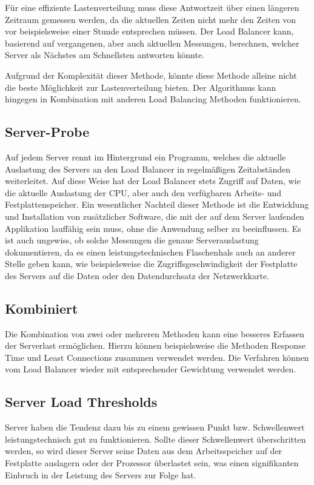 Für eine effiziente Lastenverteilung muss diese Antwortzeit über einen längeren Zeitraum gemessen werden, da die aktuellen Zeiten nicht mehr den Zeiten von vor beispielsweise einer Stunde entsprechen müssen. Der Load Balancer kann, basierend auf vergangenen, aber auch aktuellen Messungen, berechnen, welcher Server als Nächstes am Schnellsten antworten könnte.

Aufgrund der Komplexität dieser Methode, könnte diese Methode alleine nicht die beste Möglichkeit zur Lastenverteilung bieten. Der Algorithmus kann hingegen in Kombination mit anderen Load Balancing Methoden funktionieren. \cite{LoadBalancing2}

\subsection{Server-Probe}
\label{sec:Server-Probe}
Auf jedem Server rennt im Hintergrund ein Programm, welches die aktuelle Auslastung des Servers an den Load Balancer in regelmäßigen Zeitabständen weiterleitet. Auf diese Weise hat der Load Balancer stets Zugriff auf Daten, wie die aktuelle Auslastung der CPU, aber auch den verfügbaren Arbeits- und Festplattenspeicher.
Ein wesentlicher Nachteil dieser Methode ist die Entwicklung und Installation von zusätzlicher Software, die mit der auf dem Server laufenden Applikation lauffähig sein muss, ohne die Anwendung selber zu beeinflussen. Es ist auch ungewiss, ob solche Messungen die genaue Serverauslastung dokumentieren, da es einen leistungstechnischen Flaschenhals auch an anderer Stelle geben kann, wie beispielsweise die Zugriffsgeschwindigkeit der Festplatte des Servers auf die Daten oder den Datendurchsatz der Netzwerkkarte. \cite{LoadBalancing2}

\subsection{Kombiniert}
\label{sec:Kombiniert}
Die Kombination von zwei oder mehreren Methoden kann eine besseres Erfassen der Serverlast ermöglichen. Hierzu können beispielsweise die Methoden Response Time und Least Connections zusammen verwendet werden. Die Verfahren können vom Load Balancer wieder mit entsprechender Gewichtung verwendet werden. \cite{LoadBalancing2}

\subsection{Server Load Thresholds}
\label{sec:Server Load Thresholds}
Server haben die Tendenz dazu bis zu einem gewissen Punkt bzw. Schwellenwert leistungstechnisch gut zu funktionieren. Sollte dieser Schwellenwert überschritten werden, so wird dieser Server seine Daten aus dem Arbeitsspeicher auf der Festplatte auslagern oder der Prozessor überlastet sein, was einen signifikanten Einbruch in der Leistung des Servers zur Folge hat.

